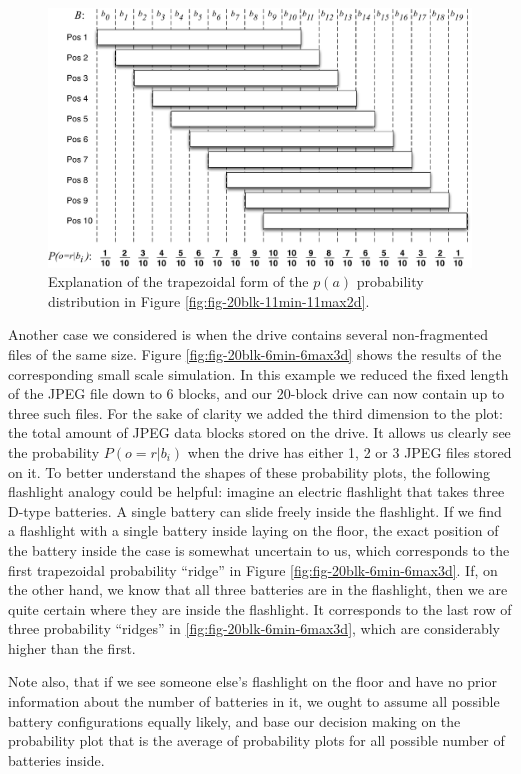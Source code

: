 \documentclass[final,5p,times,twocolumn,authoryear]{elsarticle}
\begin{document}
\begin{figure}
  \centerline{\includegraphics[width=\textwidth]{pa_explain.pdf}}
  \caption{Explanation of the trapezoidal form of the $p(a)$ probability distribution in Figure \ref{fig:fig-20blk-11min-11max2d}.}
  \label{fig:pa_explan}
\end{figure}

Another case we considered is when the drive contains several non-fragmented files of the same size. Figure \ref{fig:fig-20blk-6min-6max3d} shows the results of the corresponding small scale simulation. In this example we reduced the fixed length of the JPEG file down to 6 blocks, and our 20-block drive can now contain up to three such files. For the sake of clarity we added the third dimension to the plot: the total amount of JPEG data blocks stored on the drive. It allows us clearly see the probability $P(o=r|b_i)$ when the drive has either 1, 2 or 3 JPEG files stored on it. To better understand the shapes of these probability plots, the following flashlight analogy could be helpful: imagine an electric flashlight that takes three D-type batteries. A single battery can slide freely inside the flashlight. If we find a flashlight with a single battery inside laying on the floor, the exact position of the battery inside the case is somewhat uncertain to us, which corresponds to the first trapezoidal probability ``ridge'' in Figure \ref{fig:fig-20blk-6min-6max3d}. If, on the other hand, we know that all three batteries are in the flashlight, then we are quite certain where they are inside the flashlight. It corresponds to the last row of three probability ``ridges'' in \ref{fig:fig-20blk-6min-6max3d}, which are considerably higher than the first.

Note also, that if we see someone else's flashlight on the floor and have no prior information about the number of batteries in it, we ought to assume all possible battery configurations equally likely, and base our decision making on the probability plot that is the average of probability plots for all possible number of batteries inside.
\end{document}
